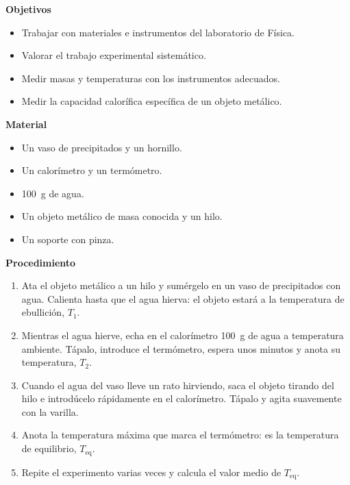 \noindent\begin{minipage}[t]{0.53\textwidth}
    \textbf{Objetivos}
    \begin{itemize}
        \item Trabajar con materiales e instrumentos del laboratorio de Física.
        \item Valorar el trabajo experimental sistemático.
        \item Medir masas y temperaturas con los instrumentos adecuados.
        \item Medir la capacidad calorífica específica de un objeto metálico.
    \end{itemize}
\end{minipage}\hfill
\begin{minipage}[t]{0.43\textwidth}
    \textbf{Material}
    \begin{itemize}
        \item Un vaso de precipitados y un hornillo.
        \item Un calorímetro y un termómetro.
        \item \qty{100}{\gram} de agua.
        \item Un objeto metálico de masa conocida y un hilo.
        \item Un soporte con pinza.
    \end{itemize}
\end{minipage}

\medskip

\textbf{Procedimiento}
\begin{enumerate}[label=\numberballgreen]
    \item Ata el objeto metálico a un hilo y sumérgelo en un vaso de precipitados con agua. Calienta hasta que el agua hierva: el objeto estará a la temperatura de ebullición, \(T_1\).
    \item Mientras el agua hierve, echa en el calorímetro \qty{100}{\gram} de agua a temperatura ambiente. Tápalo, introduce el termómetro, espera unos minutos y anota su temperatura, \(T_2\).
    \item Cuando el agua del vaso lleve un rato hirviendo, saca el objeto tirando del hilo e introdúcelo rápidamente en el calorímetro. Tápalo y agita suavemente con la varilla.
    \item Anota la temperatura máxima que marca el termómetro: es la temperatura de equilibrio, \(T_{\text{eq}}\).
    \item Repite el experimento varias veces y calcula el valor medio de \(T_{\text{eq}}\).
\end{enumerate}

